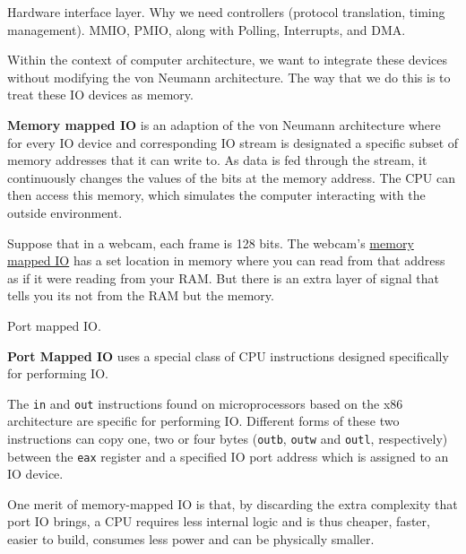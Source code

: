   Hardware interface layer. Why we need controllers (protocol translation, timing management). MMIO, PMIO, along with Polling, Interrupts, and DMA. 

  Within the context of computer architecture, we want to integrate these devices without modifying the von Neumann architecture. The way that we do this is to treat these IO devices as memory. 

  \begin{definition}
    \label{def:memory-mapped-io}
    \textbf{Memory mapped IO} is an adaption of the von Neumann architecture where for every IO device and corresponding IO stream is designated a specific subset of memory addresses that it can write to. As data is fed through the stream, it continuously changes the values of the bits at the memory address. The CPU can then access this memory, which simulates the computer interacting with the outside environment. 
  \end{definition}

  \begin{example}[Webcams]
    \label{ex:webcams}
    Suppose that in a webcam, each frame is 128 bits. The webcam's \hyperref[def:memory-mapped-io]{memory mapped IO} has a set location in memory where you can read from that address as if it were reading from your RAM. But there is an extra layer of signal that tells you its not from the RAM but the memory. 
  \end{example}

  Port mapped IO. 

  \begin{definition}
    \label{def:port-mapped-io}
    \textbf{Port Mapped IO} uses a special class of CPU instructions designed specifically for performing IO. 
  \end{definition}

  \begin{example}
    \label{ex:port-mapped-io-on-x86}
    The \texttt{in} and \texttt{out} instructions found on microprocessors based on the x86 architecture are specific for performing IO. Different forms of these two instructions can copy one, two or four bytes (\texttt{outb}, \texttt{outw} and \texttt{outl}, respectively) between the \texttt{eax} register and a specified IO port address which is assigned to an IO device.
  \end{example}

  One merit of memory-mapped IO is that, by discarding the extra complexity that port IO brings, a CPU requires less internal logic and is thus cheaper, faster, easier to build, consumes less power and can be physically smaller. 

